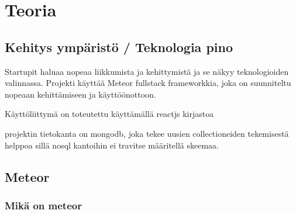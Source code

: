 \documentclass[11pt,a4paper,titlepage,oneside]{article}
\begin{document}
\newpage
\section{Teoria}                %



\subsection{Kehitys ympäristö / Teknologia pino}


Startupit haluaa nopeaa liikkumista ja kehittymistä ja se näkyy teknologioiden valinnassa.
Projekti käyttää Meteor fullstack frameworkkia, joka on suunniteltu nopeaan kehittämiseen ja käyttöönottoon.
\medskip

Käyttöliittymä on toteutettu käyttämällä reactjs kirjastoa
\medskip

projektin tietokanta on mongodb, joka tekee uusien collectioneiden tekemisestä helppoa sillä nosql kantoihin ei travitse määritellä skeemaa.
\medskip










\newpage
\subsection{Meteor}                %



\subsubsection{Mikä on meteor}







\end{document}
